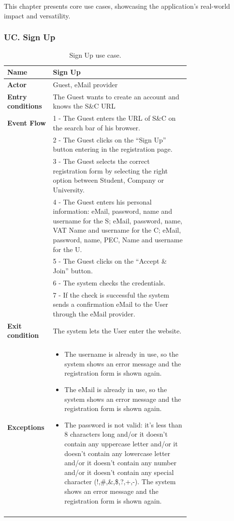 This chapter presents core use cases, showcasing the application's real-world impact and versatility.

\subsubsection*{UC\cuc . Sign Up}
\begin{center}
    \begin{longtable}{|l|p{0.75\linewidth}|}
        \hline
        \textbf{Name}               & Sign Up\\
        \hline
        \textbf{Actor}              & Guest, eMail provider\\
        \hline
        \textbf{Entry conditions}   & The Guest wants to create an account and knows the S\&C URL\\
        \hline
        \textbf{Event Flow}         & 1 - The Guest enters the URL of S\&C on the search bar of his browser.    \\
        & 2 - The Guest clicks on the “Sign Up” button entering in the registration page.    \\
        & 3 - The Guest selects the correct registration form by selecting the right option between Student, Company or University. \\
        & 4 - The Guest enters his personal information: eMail, password, name and username for the S; eMail, password, name, VAT Name and username for the C; eMail, password, name, PEC, Name and username for the U. \\
        & 5 - The Guest clicks on the “Accept \& Join” button.  \\
        & 6 - The system checks the credentials.    \\
        & 7 - If the check is successful the system sends a confirmation eMail to the User through the eMail provider.  \\
        \hline
        \textbf{Exit condition}   & The system lets the User enter the website. \\       
        \hline
        \textbf{Exceptions}       & \begin{itemize}
            \item The username is already in use, so the system shows an error message and the registration form is shown again.
            \item The eMail is already in use, so the system shows an error message and the registration form is shown again.
            \item The password is not valid: it’s less than 8 characters long and/or it doesn’t contain any uppercase letter and/or it doesn’t contain any lowercase letter and/or it doesn’t contain any number and/or it doesn’t contain any special character (!,\#,\&,\$,?,+,-). The system shows an error message and the registration form is shown again.
        \end{itemize}\\
        \hline
        \caption{Sign Up use case.}
        \label{tab: sign_up_use_case}
    \end{longtable}
\end{center}


